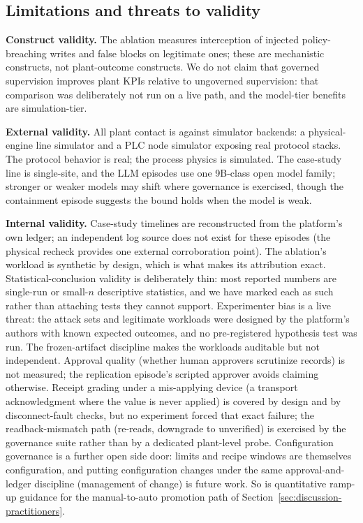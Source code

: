 \subsection{Limitations and threats to validity}
\label{sec:discussion-limits}

\textbf{Construct validity.} The ablation measures interception of
injected policy-breaching writes and false blocks on legitimate ones;
these are mechanistic constructs, not plant-outcome constructs. We do
not claim that governed supervision improves plant KPIs relative to
ungoverned supervision: that comparison was deliberately not run on a
live path, and the model-tier benefits are simulation-tier.

\textbf{External validity.} All plant contact is against simulator
backends: a physical-engine line simulator and a PLC node simulator
exposing real protocol stacks. The protocol behavior is real; the
process physics is simulated. The case-study line is single-site, and
the LLM episodes use one 9B-class open model family; stronger or
weaker models may shift where governance is exercised, though the
containment episode suggests the bound holds when the model is weak.

\textbf{Internal validity.} Case-study timelines are reconstructed from
the platform's own ledger; an independent log source does not exist for
these episodes (the physical recheck provides one external corroboration
point). The ablation's workload is synthetic by design, which is what
makes its attribution exact. Statistical-conclusion validity is
deliberately thin: most reported numbers are single-run or small-$n$
descriptive statistics, and we have marked each as such rather than
attaching tests they cannot support. Experimenter bias is a live
threat: the attack sets and legitimate workloads were designed by the
platform's authors with known expected outcomes, and no pre-registered
hypothesis test was run. The frozen-artifact discipline makes the
workloads auditable but not independent. Approval quality (whether human
approvers scrutinize records) is not measured; the replication episode's
scripted approver avoids claiming otherwise. Receipt grading under a
mis-applying device (a transport acknowledgment where the value is never
applied) is covered by design and by disconnect-fault checks, but no
experiment forced that exact failure; the readback-mismatch path
(re-reads, downgrade to unverified) is exercised by the
governance suite rather than by a dedicated plant-level probe.
Configuration governance is a further open side door: limits and recipe
windows are themselves configuration, and putting configuration changes
under the same approval-and-ledger discipline (management of change) is
future work. So is quantitative ramp-up guidance for the
manual-to-auto promotion path of
Section~\ref{sec:discussion-practitioners}.

